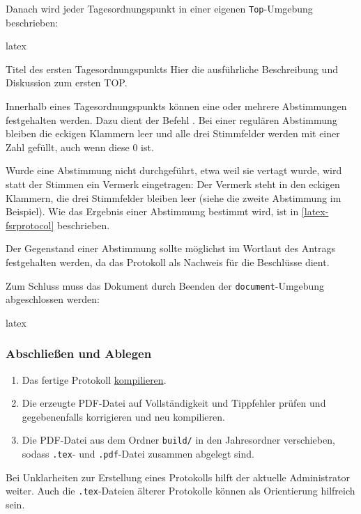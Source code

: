 Danach wird jeder Tagesordnungspunkt in einer eigenen \texttt{Top}-Umgebung beschrieben:

\begin{Codeblock}[title={Erstellen eines Tagesordnungspunkts mit Abstimmungen}]{latex}
	\begin{Top}{Titel des ersten Tagesordnungspunkts}
		Hier die ausführliche Beschreibung und Diskussion zum ersten TOP.
	\end{Top}
\end{Codeblock}

Innerhalb eines Tagesordnungspunkts können eine oder mehrere Abstimmungen festgehalten werden. Dazu dient der Befehl \texttt{}. Bei einer regulären Abstimmung bleiben die eckigen Klammern leer und alle drei Stimmfelder werden mit einer Zahl gefüllt, auch wenn diese 0 ist.

Wurde eine Abstimmung nicht durchgeführt, etwa weil sie vertagt wurde, wird statt der Stimmen ein Vermerk eingetragen: Der Vermerk steht in den eckigen Klammern, die drei Stimmfelder bleiben leer (siehe die zweite Abstimmung im Beispiel). Wie das Ergebnis einer Abstimmung bestimmt wird, ist in \autoref{latex-fsrprotocol} beschrieben.

Der Gegenstand einer Abstimmung sollte möglichst im Wortlaut des Antrags festgehalten werden, da das Protokoll als Nachweis für die Beschlüsse dient.

Zum Schluss muss das Dokument durch Beenden der \texttt{document}-Umgebung abgeschlossen werden:

\begin{Codeblock}[title={Abschließen des Dokuments}]{latex}
	
\end{Codeblock}

\subsubsection{Abschließen und Ablegen}
\label{protokoll-ablegen}
\begin{enumerate}
	\item Das fertige Protokoll \hyperref[latex-kompilieren]{kompilieren}.
	\item Die erzeugte PDF-Datei auf Vollständigkeit und Tippfehler prüfen und gegebenenfalls korrigieren und neu kompilieren.
	\item Die PDF-Datei aus dem Ordner \texttt{build/} in den Jahresordner verschieben, sodass \texttt{.tex}- und \texttt{.pdf}-Datei zusammen abgelegt sind.
\end{enumerate}

Bei Unklarheiten zur Erstellung eines Protokolls hilft der aktuelle Administrator weiter. Auch die \texttt{.tex}-Dateien älterer Protokolle können als Orientierung hilfreich sein.
